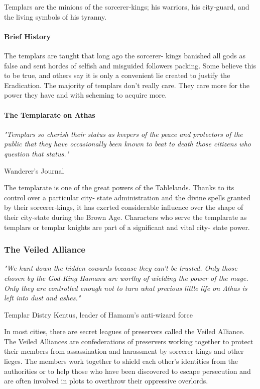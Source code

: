 \begin{multicols}{2}
Templars are the minions of the sorcerer‐kings; his
warriors, his city‐guard, and the living symbols of his
tyranny.

\paragraph{Brief History}
The templars are taught that long ago the sorcerer‐
kings banished all gods as false and sent hordes of selfish
and misguided followers packing. Some believe this to be
true, and others say it is only a convenient lie created to
justify the Eradication. The majority of templars don’t
really care. They care more for the power they have and
with scheming to acquire more.
\paragraph{The Templarate on Athas}
\epigraph{\textit{
"Templars so cherish their status as keepers of the peace
and protectors of the public that they have occasionally been
known to beat to death those citizens who question that
status." }}
{ Wanderer's Journal }

The templarate is one of the great powers of the
Tablelands. Thanks to its control over a particular city‐
state administration and the divine spells granted by their
sorcerer‐kings, it has exerted considerable influence over
the shape of their city‐state during the Brown Age.
Characters who serve the templarate as templars or
templar knights are part of a significant and vital city‐
state power.

\subsubsection{The Veiled Alliance}
\epigraph{\textit{
"We hunt down the hidden cowards because they can't be
trusted. Only those chosen by the God-King Hamanu are
worthy of wielding the power of the mage. Only they are
controlled enough not to turn what precious little life on
Athas is left into dust and ashes." }}
{ Templar Distry Kentus, leader of Hamanu's anti‐wizard force }

In most cities, there are secret leagues of preservers
called the Veiled Alliance. The Veiled Alliances are
confederations of preservers working together to protect
their members from assassination and harassment by
sorcerer‐kings and other lieges. The members work
together to shield each other’s identities from the
authorities or to help those who have been discovered to
escape persecution and are often involved in plots to
overthrow their oppressive overlords.


\end{multicols}

